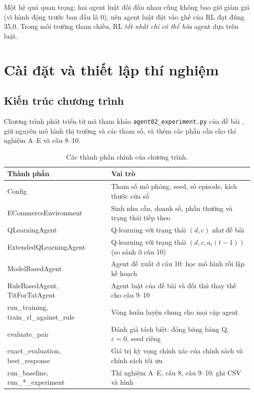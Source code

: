 \documentclass[12pt,a4paper]{report}
\begin{document}
Một hệ quả quan trọng: hai agent luật đối đầu nhau cũng không bao giờ giảm giá (vì
hành động trước ban đầu là 0), nên agent luật đặt vào ghế của RL đạt đúng 35{,}0.
Trong môi trường tham chiếu, RL \emph{tốt nhất chỉ có thể hòa} agent dựa trên luật.

\section{Cài đặt và thiết lập thí nghiệm}
\label{chap:setup}

\subsection{Kiến trúc chương trình}
Chương trình phát triển từ mã tham khảo \texttt{agent02\_experiment.py} của đề bài
\cite{complementary}, giữ nguyên mô hình thị trường và các tham số, và thêm các phần
cần cho thí nghiệm A--E và câu 8--10.

\begin{table}[H]
\centering
\small
\caption{Các thành phần chính của chương trình.}
\begin{tabularx}{\textwidth}{>{\ttfamily}p{5.2cm}X}
\toprule
\normalfont\bfseries Thành phần & \bfseries Vai trò \\
\midrule
Config & Tham số mô phỏng, seed, số episode, kích thước cửa sổ \\
ECommerceEnvironment & Sinh nhu cầu, doanh số, phần thưởng và trạng thái tiếp theo \\
QLearningAgent & Q-learning với trạng thái $(d,c)$ như đề bài \\
ExtendedQLearningAgent & Q-learning với trạng thái $(d,c,a_i(t-1))$ (so sánh ở câu 10) \\
ModelBasedAgent & Agent đề xuất ở câu 10: học mô hình rồi lập kế hoạch \\
RuleBasedAgent, TitForTatAgent & Agent luật của đề bài và đối thủ thay thế cho câu 9--10 \\
run\_training, train\_rl\_against\_rule & Vòng huấn luyện chung cho mọi cặp agent \\
evaluate\_pair & Đánh giá tách biệt: đóng băng bảng Q, $\varepsilon=0$, seed riêng \\
exact\_evaluation, best\_response & Giá trị kỳ vọng chính xác của chính sách và chính sách tối ưu \\
run\_baseline, run\_*\_experiment & Thí nghiệm A--E, câu 8, câu 9--10; ghi CSV và hình \\
\bottomrule
\end{tabularx}
\end{table}
\end{document}
